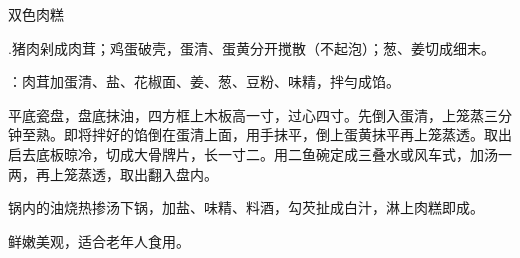 \begin{recipe}[金银肉糕]{双色肉糕}

\ingredients


\cooking

\step .猪肉剁成肉茸；鸡蛋破壳，蛋清、蛋黄分开搅散（不起泡）；葱、姜切成细末。

\step ：肉茸加蛋清、盐、花椒面、姜、葱、豆粉、味精，拌勻成馅。

\step 平底瓷盘，盘底抹油，四方框上木板高一寸，过心四寸。先倒入蛋清，上笼蒸三分钟至熟。即将拌好的馅倒在蛋清上面，用手抹平，倒上蛋黄抹平再上笼蒸透。取出启去底板晾冷，切成大骨牌片，长一寸二。用二鱼碗定成三叠水或风车式，加汤一两，再上笼蒸透，取出翻入盘内。

\step 锅内的油烧热掺汤下锅，加盐、味精、料酒，勾芡扯成白汁，淋上肉糕即成。

\notes

鲜嫩美观，适合老年人食用。


\end{recipe}

